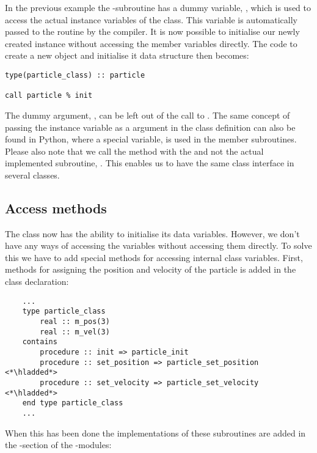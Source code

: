 In the previous example the -subroutine has a dummy variable, , which is used to access the actual instance variables of the class. This variable is automatically passed to the routine by the compiler. It is now possible to initialise our newly created instance without accessing the member variables directly. The code to create a new object and initialise it data structure then becomes:

\begin{lstlisting}
type(particle_class) :: particle

call particle % init
\end{lstlisting}

The dummy argument, , can be left out of the call to . The same concept of passing the instance variable as a argument in the class definition can also be found in Python, where a special variable,  is used in the member subroutines. Please also note that we call the method with the  and not the actual implemented subroutine, . This enables us to have the same class interface in several classes.

\subsection{Access methods}

The class now has the ability to initialise its data variables. However, we don't have any ways of accessing the variables without accessing them directly. To solve this we have to add special methods for accessing internal class variables. First, methods for assigning the position and velocity of the particle is added in the class declaration:

\begin{lstlisting}
    ...
    type particle_class
        real :: m_pos(3)
        real :: m_vel(3)
    contains
        procedure :: init => particle_init
        procedure :: set_position => particle_set_position <*\hladded*>
        procedure :: set_velocity => particle_set_velocity <*\hladded*>
    end type particle_class
    ...
\end{lstlisting}

When this has been done the implementations of these subroutines are added in the -section of the -modules:
    
